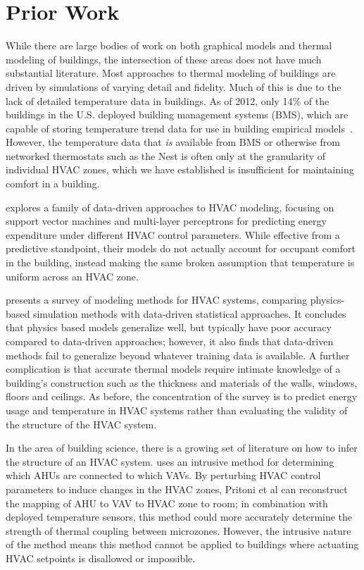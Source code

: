 \section{Prior Work}

While there are large bodies of work on both graphical models and thermal modeling of buildings, the intersection of these areas does not have much substantial literature.
Most approaches to thermal modeling of buildings are driven by simulations of varying detail and fidelity.
Much of this is due to the lack of detailed temperature data in buildings.
As of 2012, only 14\% of the buildings in the U.S. deployed building management systems (BMS), which are capable of storing temperature trend data for use in building empirical models~\cite{cbecs2012}.
However, the temperature data that \emph{is} available from BMS or otherwise from networked thermostats such as the Nest is often only at the granularity of individual HVAC zones, which we have established is insufficient for maintaining comfort in a building.

\cite{kusiak2010modeling} explores a family of data-driven approaches to HVAC modeling, focusing on support vector machines and multi-layer perceptrons for predicting energy expenditure under different HVAC control parameters.
While effective from a predictive standpoint, their models do not actually account for occupant comfort in the building, instead making the same broken assumption that temperature is uniform across an HVAC zone.

\cite{afram2014review} presents a survey of modeling methods for HVAC systems, comparing physics-based simulation methods with data-driven statistical approaches.
It concludes that physics based models generalize well, but typically have poor accuracy compared to data-driven approaches; however, it also finds that data-driven methods fail to generalize beyond whatever training data is available.
A further complication is that accurate thermal models require intimate knowledge of a building's construction such as the thickness and materials of the walls, windows, floors and ceilings.
As before, the concentration of the survey is to predict energy usage and temperature in HVAC systems rather than evaluating the validity of the structure of the HVAC system.

In the area of building science, there is a growing set of literature on how to infer the structure of an HVAC system. \cite{pritoni2015short} uses an intrusive method for determining which AHUs are connected to which VAVs.
By perturbing HVAC control parameters to induce changes in the HVAC zones, Pritoni et al can reconstruct the mapping of AHU to VAV to HVAC zone to room; in combination with deployed temperature sensors, this method could more accurately determine the strength of thermal coupling between microzones.
However, the intrusive nature of the method means this method cannot be applied to buildings where actuating HVAC setpoints is disallowed or impossible.

